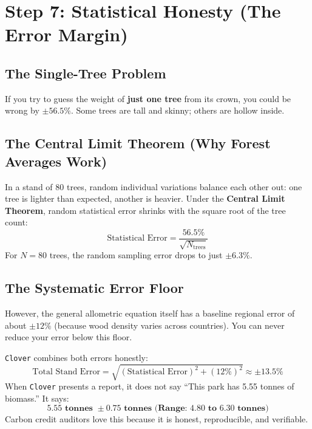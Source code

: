 \documentclass[11pt,a4paper]{article}
\begin{document}
\section{Step 7: Statistical Honesty (The Error Margin)}

\subsection{The Single-Tree Problem}
If you try to guess the weight of \textbf{just one tree} from its crown, you could be wrong by $\pm 56.5\%$. Some trees are tall and skinny; others are hollow inside.

\subsection{The Central Limit Theorem (Why Forest Averages Work)}
In a stand of 80 trees, random individual variations balance each other out: one tree is lighter than expected, another is heavier. Under the \textbf{Central Limit Theorem}, random statistical error shrinks with the square root of the tree count:
\begin{equation}
\text{Statistical Error} = \frac{56.5\%}{\sqrt{N_{\text{trees}}}}
\end{equation}
For $N = 80$ trees, the random sampling error drops to just $\mathbf{\pm 6.3\%}$.

\subsection{The Systematic Error Floor}
However, the general allometric equation itself has a baseline regional error of about $\pm 12\%$ (because wood density varies across countries). You can never reduce your error below this floor.

\texttt{Clover} combines both errors honestly:
\begin{equation}
\text{Total Stand Error} = \sqrt{(\text{Statistical Error})^2 + (12\%)^2} \approx \mathbf{\pm 13.5\%}
\end{equation}
When \texttt{Clover} presents a report, it does not say ``This park has 5.55 tonnes of biomass.'' It says:
$$\mathbf{5.55 \text{ tonnes } \pm 0.75 \text{ tonnes (Range: } 4.80 \text{ to } 6.30 \text{ tonnes)}}$$
Carbon credit auditors love this because it is honest, reproducible, and verifiable.
\end{document}
